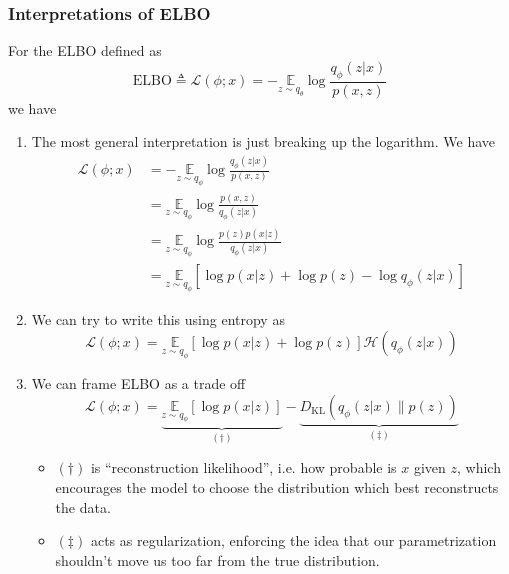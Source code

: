 \documentclass[11pt]{article}
\newcommand{\kl}{\mathrm{KL}}
\begin{document}
\subsubsection{Interpretations of ELBO}
For the ELBO defined as
\begin{equation}
    \mathrm{ELBO} \triangleq \mathcal{L}(\phi ; x) =-\underset{z \sim q_{\theta}}{\mathbb{E}} \log \frac{q_{\phi}(z | x)}{p(x, z)}
\end{equation}
we have
\begin{enumerate}
    \item The most general interpretation is just breaking up the logarithm. We have
    \begin{align}
        \mathcal{L}(\phi ; x)
        &=-\underset{z \sim q_{\phi}}{\mathbb{E}} \log \frac{q_{\phi}(z | x)}{p(x, z)} \\
        &= \underset{z \sim q_{\phi}}{\mathbb{E}} \log \frac{p(x, z)}{q_{\phi}(z | x)} \\
        &= \underset{z \sim q_{\phi}}{\mathbb{E}} \log \frac{p(z) p(x | z)}{q_{\phi}(z | x)} \\
        &= \underset{z \sim q_{\phi}}{\mathbb{E}}\left[\log p(x | z)+\log p(z)-\log q_{\phi}(z | x)\right]
    \end{align}
    \item We can try to write this using entropy as 
    \begin{equation}
        \mathcal{L}(\phi ; x) = \underset{z \sim q_{\phi}}{\mathbb{E}}[\log p(x | z)+\log p(z)] \mathcal{H}\left(q_{\phi}(z | x)\right)
    \end{equation}
    \item We can frame ELBO as a trade off
    \begin{equation}
        \mathcal{L}(\phi ; x) = \underbrace{\underset{z \sim q_{\phi}}{\mathbb{E}}[\log p(x | z)]}_{(\dag)} - \underbrace{D_{\kl }\left(q_{\phi}(z | x) \| p(z)\right)}_{(\ddag)}
    \end{equation}
    \begin{itemize}
        \item $(\dag)$ is ``reconstruction likelihood'', i.e. how probable is $x$ given $z$, which encourages the model to choose the distribution which best reconstructs the data. 
        \item $(\ddag)$ acts as regularization, enforcing the idea that our parametrization shouldn't move us too far from the true distribution. 
    \end{itemize}
\end{enumerate}
\end{document}
